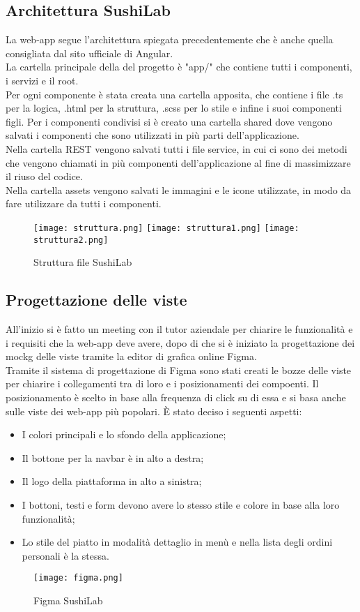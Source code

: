 \subsection{Architettura SushiLab}
La web-app segue l'architettura spiegata precedentemente che è anche quella consigliata dal sito ufficiale di Angular.\\
La cartella principale della del progetto è "app/" che contiene tutti i componenti, i servizi e il root.\\ 
Per ogni componente è stata creata una cartella apposita, che contiene i file .ts per la logica, .html per la struttura, .scss per lo stile e infine i suoi componenti figli. Per i componenti condivisi si è creato una cartella shared dove vengono salvati i componenti che sono utilizzati in più parti dell'applicazione.\\
Nella cartella REST vengono salvati tutti i file service, in cui ci sono dei metodi che vengono chiamati in più componenti dell'applicazione al fine di massimizzare il riuso del codice.\\
Nella cartella assets vengono salvati le immagini e le icone utilizzate, in modo da fare utilizzare da tutti i componenti.\\
\begin{figure}[H]
    \centering
    \texttt{[image: struttura.png]}
    \texttt{[image: struttura1.png]}
    \texttt{[image: struttura2.png]}
    \caption{Struttura file SushiLab}
\end{figure}
\subsection{Progettazione delle viste}
All'inizio si è fatto un meeting con il tutor aziendale per chiarire le funzionalità e i requisiti che la web-app deve avere, dopo di che si è iniziato la progettazione dei \gls{mockg} delle viste tramite la editor di grafica online Figma.\\
Tramite il sistema di progettazione di Figma sono stati creati le bozze delle viste per chiarire i collegamenti tra di loro e i posizionamenti dei compoenti. 
Il posizionamento è scelto in base alla frequenza di click su di essa e si basa anche sulle viste dei web-app più popolari.
È stato deciso i seguenti aspetti:
\begin{itemize}
    \item I colori principali e lo sfondo della applicazione;
    \item Il bottone per la navbar è in alto a destra;
    \item Il logo della piattaforma in alto a sinistra;
    \item I bottoni, testi e form devono avere lo stesso stile e colore in base alla loro funzionalità;
    \item Lo stile del piatto in modalità dettaglio in menù e nella lista degli ordini personali è la stessa.
\end{itemize}
\begin{figure}[H]
    \centering
    \texttt{[image: figma.png]}
    \caption{Figma SushiLab}
\end{figure}
